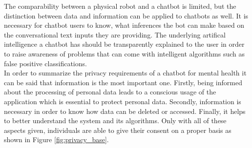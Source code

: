 \documentclass[sigconf, nonacm]{acmart}
\begin{document}
The comparability between a physical robot and a chatbot is limited, but the distinction between data and information can be applied to chatbots as well. It is necessary for chatbot users to know, what inferences the bot can make based on the conversational text inputs they are providing. The underlying artifical intelligence a chatbot has should be transparently explained 
to the user in order to raise awareness of problems that can come with intelligent algorithms such as false positive classifications.
\\
In order to summarize the privacy requirements of a chatbot for mental health it can be said that information is the most important one. Firstly, being informed about the processing of personal data leads to a conscious usage of the application which is essential to protect personal data. Secondly, information is necessary in order to know how data can be deleted or accessed. Finally, it helps to better understand the system and 
its algorithms. Only with all of these aspects given, individuals are able to give their consent on a proper basis as shown in Figure \ref{fig:privacy_base}. 
\end{document}
